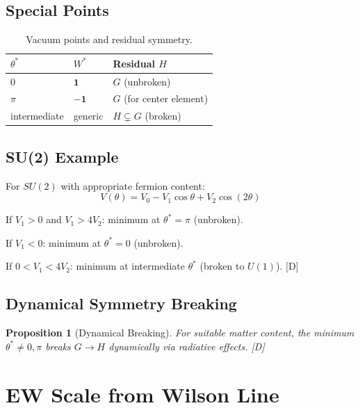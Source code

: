 \documentclass[11pt,a4paper]{article}
\newtheorem{proposition}[theorem]{Proposition}
\newcommand{\tagD}{\textcolor{blue!70!black}{[D]}}
\begin{document}
\subsection{Special Points}

\begin{table}[h]
\centering
\begin{tabular}{lll}
\toprule
$\theta^*$ & $W^*$ & Residual $H$ \\
\midrule
$0$ & $\mathbf{1}$ & $G$ (unbroken) \\
$\pi$ & $-\mathbf{1}$ & $G$ (for center element) \\
intermediate & generic & $H \subsetneq G$ (broken) \\
\bottomrule
\end{tabular}
\caption{Vacuum points and residual symmetry.}
\label{tab:vacua}
\end{table}

\subsection{SU(2) Example}

For $SU(2)$ with appropriate fermion content:
\begin{equation}
\label{eq:su2-potential}
V(\theta) = V_0 - V_1 \cos\theta + V_2 \cos(2\theta)
\end{equation}

If $V_1 > 0$ and $V_1 > 4V_2$: minimum at $\theta^* = \pi$ (unbroken).

If $V_1 < 0$: minimum at $\theta^* = 0$ (unbroken).

If $0 < V_1 < 4V_2$: minimum at intermediate $\theta^*$ (broken to $U(1)$). \tagD

\subsection{Dynamical Symmetry Breaking}

\begin{proposition}[Dynamical Breaking]
\label{prop:dynamical}
For suitable matter content, the minimum $\theta^* \neq 0, \pi$ breaks
$G \to H$ dynamically via radiative effects. \tagD
\end{proposition}

\section{EW Scale from Wilson Line}
\end{document}
